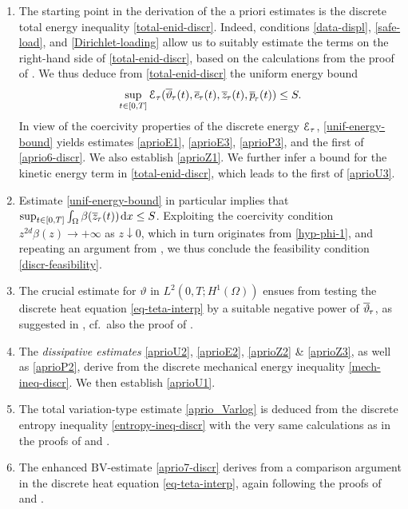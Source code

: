 \documentclass[a4paper,10pt,reqno]{amsart}
\numberwithin{equation}{section}
\numberwithin{equation}{section}
\newcommand{\down}{\downarrow}
\def\dd{\;\!\mathrm{d}} %
\newcommand{\teta}{\vartheta}
\newcommand{\piecewiseConstant}[2]{\overline{#1}_{\kern-1pt#2}}
\newcommand{\pwc}{\piecewiseConstant}
\newcommand{\BV}{\mathrm{BV}}
\newcommand{\EEE}{\color{black}}
\newcommand{\MMM}{\color{black}}%
\begin{document}
\begin{enumerate}
\item  The starting point in the derivation of the a priori estimates is 
 the discrete total energy inequality \eqref{total-enid-discr}. 
Indeed, conditions \eqref{data-displ}, \eqref{safe-load}, and \eqref{Dirichlet-loading} allow us to suitably estimate the terms on the right-hand side of \eqref{total-enid-discr},
based on the calculations from the proof of  \cite[Prop.\ 4.3]{Rossi2016}.
We thus deduce from \eqref{total-enid-discr} the uniform energy bound
\begin{equation}
\label{unif-energy-bound}
\sup_{t\in [0,T]} \calE_\tau (\pwc \teta\tau(t), \pwc e\tau(t), \pwc z\tau(t), \pwc p \tau(t)) \leq S.
\end{equation}
In view of the  coercivity
properties of the discrete energy ${\mathcal E}_\tau$, \eqref{unif-energy-bound}
yields estimates  \eqref{aprioE1}, \eqref{aprioE3}, \eqref{aprioP3}, and the first of \eqref{aprio6-discr}.
\MMM We also establish   \eqref{aprioZ1}.
 We further \EEE 
infer a  bound for the kinetic energy term in \eqref{total-enid-discr}, which leads to the %
first of \eqref{aprioU3}. 
\item Estimate \eqref{unif-energy-bound}  in particular implies that $\sup_{t\in [0,T]} \int_\Omega \beta(\pwc z\tau(t)) \dd x \leq S$. Exploiting the coercivity condition
$z^{2d} \beta(z) \to +\infty$ as $z \down 0$, which in turn originates from \eqref{hyp-phi-1}, and repeating an argument from \cite[Lemma 3.3]{Crismale-Lazzaroni}, 
we thus conclude  the feasibility condition \eqref{discr-feasibility}. 
\item The crucial estimate for $\teta$ in $L^2(0,T;H^1(\Omega))$  ensues from testing the discrete heat equation \eqref{eq-teta-interp} by a suitable negative power of $\pwc \teta\tau$, 
as suggested in \cite{FPR09}, cf.\ also the proof of \cite[Prop.\ 4.10]{Rocca-Rossi}.
\item The \emph{dissipative estimates} \eqref{aprioU2}, \eqref{aprioE2}, \eqref{aprioZ2} \& \eqref{aprioZ3}, as well as \eqref{aprioP2}, derive from the discrete mechanical energy 
inequality \eqref{mech-ineq-discr}. \MMM We then establish \eqref{aprioU1}. \EEE
\item The total variation-type estimate \eqref{aprio_Varlog} %
 is deduced from the discrete entropy inequality \eqref{entropy-ineq-discr}  with the very same calculations as in the proofs of 
 \cite[Prop.\ 4.10]{Rocca-Rossi} and \cite[Prop.\ 4.3]{Rossi2016}.
 \item The enhanced $\BV$-estimate \eqref{aprio7-discr} derives from a comparison argument in the discrete heat equation  \eqref{eq-teta-interp}, again following the proofs of 
  \cite[Prop.\ 4.10]{Rocca-Rossi} and \cite[Prop.\ 4.3]{Rossi2016}.
  \end{enumerate}
\end{document}
